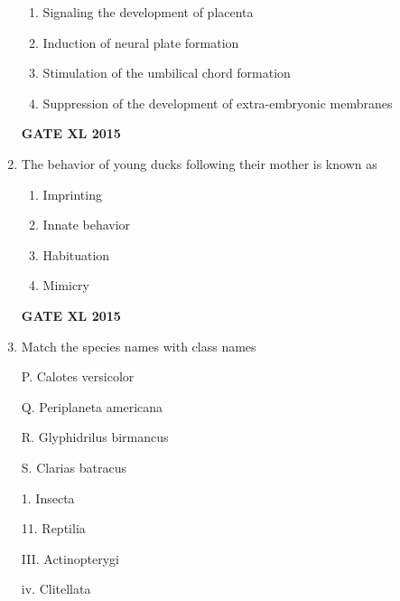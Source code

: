 \documentclass[journal,12pt,onecolumn]{IEEEtran}
\begin{document}
\begin{enumerate}
\begin{enumerate}
            \item Signaling the development of placenta
	    \item  Induction of neural plate formation
	    \item Stimulation of the umbilical chord formation
            \item Suppression of the development of extra-embryonic membranes
    \end{enumerate}
\begin{flushright}\textbf{GATE XL 2015}\end{flushright}
\item  The behavior of young ducks following their mother is known as
    \begin{enumerate}
            \item Imprinting
	    \item Innate behavior
	    \item Habituation
            \item Mimicry
    \end{enumerate}
\begin{flushright}\textbf{GATE XL 2015}\end{flushright}
\item Match the species names with class names

	\begin{minipage}{0.5\textwidth}
		\begin{flushleft}
P. Calotes versicolor

Q. Periplaneta americana

R. Glyphidrilus birmancus

S. Clarias batracus

	\end{flushleft}
	\end{minipage}
	\begin{minipage}{0.5\textwidth}\begin{flushleft}
1. Insecta

11. Reptilia

III. Actinopterygi

iv. Clitellata


\end{flushleft}
\end{minipage}
\end{enumerate}
\end{document}
